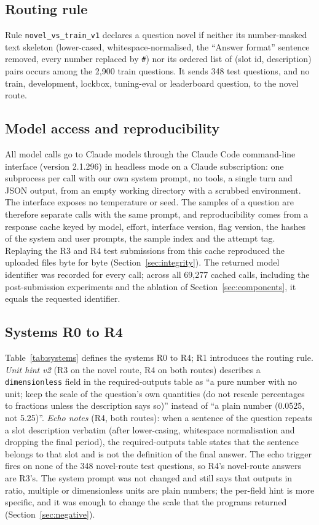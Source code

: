 \documentclass[conference]{IEEEtran}
\newcommand{\id}[1]{\texttt{#1}}
\begin{document}
\subsection{Routing rule}\label{sec:routing}
Rule \id{novel\_vs\_train\_v1} declares a question novel if neither its number-masked text skeleton (lower-cased, whitespace-normalised, the ``Answer format'' sentence removed, every number replaced by \id{\#}) nor its ordered list of (slot id, description) pairs occurs among the 2,900 train questions. It sends 348 test questions, and no train, development, lockbox, tuning-eval or leaderboard question, to the novel route.

\subsection{Model access and reproducibility}\label{sec:model}
All model calls go to Claude models through the Claude Code command-line interface (version 2.1.296) in headless mode on a Claude subscription: one subprocess per call with our own system prompt, no tools, a single turn and JSON output, from an empty working directory with a scrubbed environment. The interface exposes no temperature or seed. The samples of a question are therefore separate calls with the same prompt, and reproducibility comes from a response cache keyed by model, effort, interface version, flag version, the hashes of the system and user prompts, the sample index and the attempt tag. Replaying the R3 and R4 test submissions from this cache reproduced the uploaded files byte for byte (Section~\ref{sec:integrity}). The returned model identifier was recorded for every call; across all 69,277 cached calls, including the post-submission experiments and the ablation of Section~\ref{sec:components}, it equals the requested identifier.

\subsection{Systems R0 to R4}\label{sec:systems}
Table~\ref{tab:systems} defines the systems R0 to R4; R1 introduces the routing rule. \emph{Unit hint v2} (R3 on the novel route, R4 on both routes) describes a \id{dimensionless} field in the required-outputs table as ``a pure number with no unit; keep the scale of the question's own quantities (do not rescale percentages to fractions unless the description says so)'' instead of ``a plain number (0.0525, not 5.25)''. \emph{Echo notes} (R4, both routes): when a sentence of the question repeats a slot description verbatim (after lower-casing, whitespace normalisation and dropping the final period), the required-outputs table states that the sentence belongs to that slot and is not the definition of the final answer. The echo trigger fires on none of the 348 novel-route test questions, so R4's novel-route answers are R3's. The system prompt was not changed and still says that outputs in ratio, multiple or dimensionless units are plain numbers; the per-field hint is more specific, and it was enough to change the scale that the programs returned (Section~\ref{sec:negative}).
\end{document}
